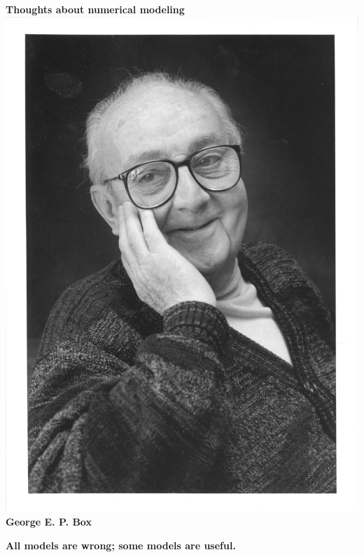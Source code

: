 \documentclass{beamer}
\begin{document}
\begin{frame}[t]
\begin{center}
  {\color{DarkBlue} \textbf{\Large Thoughts about numerical modeling} }\\
   \includegraphics[scale=0.3]{GeorgeEPBox.jpg} \\

   \color{DarkCharcoal} \textbf{\large George E. P. Box}

  \vspace*{0.5em}\color{AlertColor} \textbf{\large All models are wrong; some models are useful.}

\end{center}
\end{frame}
\end{document}

